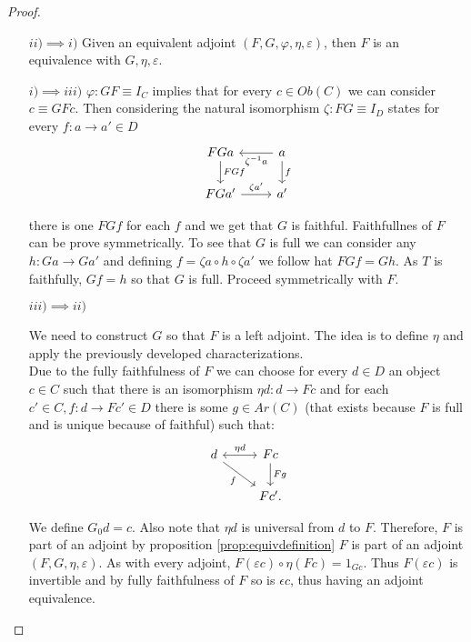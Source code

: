 \begin{proof}\
  \  
  \begin{itemize}
  \item[$ii)\implies i)$] Given an equivalent adjoint $(F,G,\varphi,\eta,\varepsilon)$, then $F$ is an equivalence with $G,\eta,\varepsilon$. 
  \item[$i)\implies iii)$] $\varphi: GF\equiv I_C$ implies that for every $c\in Ob(C)$ we can consider $c\equiv GFc$. Then considering the natural isomorphism $\zeta: FG\equiv I_D$ states for every $f:a\to a'\in D$
    \[
      \begin{tikzcd}
        FGa \arrow{d}{FG f}& a\arrow{d}{f}\arrow{l}{\zeta^{-1} a}\\
        FGa' \arrow{r}{\zeta a'}& a'
      \end{tikzcd}
    \]

    there is one $FG f$ for each $f$ and we get that $G$ is faithful. Faithfullnes of $F$ can be prove symmetrically. To see that $G$ is full we can consider any $h:Ga\to Ga'$ and defining $f=\zeta a\circ h \circ \zeta a'$ we follow hat $FG f = Gh$. As $T$ is faithfully, $Gf=h$ so that $G$ is full. Proceed symmetrically with $F$.  
  \item[$iii)\implies ii)$]


    We need to construct $G$ so that $F$ is a left adjoint. The idea is to define $\eta$ and apply the previously developed characterizations.\\


    Due to the fully faithfulness of $F$ we can choose for every $d\in D$ an object $c\in C$ such that there is an isomorphism $\eta d: d \to Fc$ and for each $c'\in C, f:d\to Fc'\in D$ there is some $g\in Ar(C)$ (that exists because $F$ is full and is unique because of faithful) such that:
    \[
      \begin{tikzcd}
        d\arrow[leftrightarrow]{r}{\eta d}\arrow[swap]{dr}{f}& Fc\arrow{d}{Fg}\\
        & Fc'.
      \end{tikzcd} 
    \]  

    We define $G_0d = c$. Also note  that $\eta d$ is universal from $d$ to $F$. Therefore, $F$ is part of an adjoint by proposition \ref{prop:equivdefinition} $F$ is part of an adjoint $(F,G,\eta, \varepsilon)$. As with every adjoint, $F (\varepsilon c)\circ \eta (Fc) =1_{Gc}$. Thus $F(\varepsilon c)$ is invertible and by  fully faithfulness of $F$ so is $\epsilon c$, thus having an adjoint equivalence.




  \end{itemize}
\end{proof}


